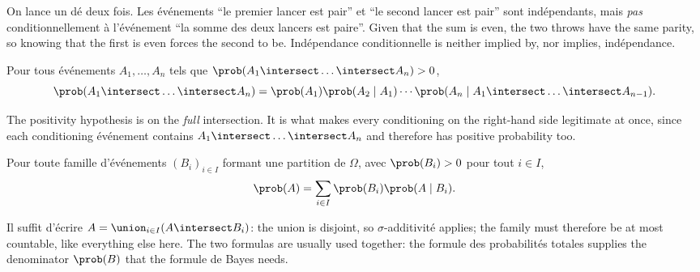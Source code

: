 \begin{example}
  On lance un dé deux fois. Les événements ``le premier lancer est pair'' et
  ``le second lancer est pair'' sont indépendants, mais \emph{pas}
  conditionnellement à l'événement ``la somme des deux lancers est paire''.
  Given that the sum is even, the two throws have the same parity, so knowing
  that the first is even forces the second to be. Indépendance conditionnelle is
  neither implied by, nor implies, indépendance.
\end{example}

\begin{prop}
  Pour tous événements $A_{1}, \dots, A_{n}$ tels que
  $\prob(A_{1} \intersect \dots \intersect A_{n}) > 0$,
  \[ \prob(A_{1} \intersect \dots \intersect A_{n})
       = \prob(A_{1}) \prob(A_{2} \mid A_{1}) \cdots
         \prob(A_{n} \mid A_{1} \intersect \dots \intersect A_{n-1}). \]
\end{prop}

The positivity hypothesis is on the \emph{full} intersection. It is what makes
every conditioning on the right-hand side legitimate at once, since each
conditioning événement contains $A_{1} \intersect \dots \intersect A_{n}$ and
therefore has positive probability too.

\begin{prop}
  Pour toute famille d'événements $(B_{i})_{i \in I}$ formant une partition de
  $\Omega$, avec $\prob(B_{i}) > 0$ pour tout $i \in I$,
  \[ \prob(A) = \sum_{i \in I} \prob(B_{i}) \prob(A \mid B_{i}). \]
\end{prop}

Il suffit d'écrire $A = \union_{i \in I} (A \intersect B_{i})$: the union is
disjoint, so $\sigma$-additivité applies; the family must therefore be at most
countable, like everything else here. The two formulas are usually used
together: the formule des probabilités totales supplies the denominator
$\prob(B)$ that the formule de Bayes needs.

